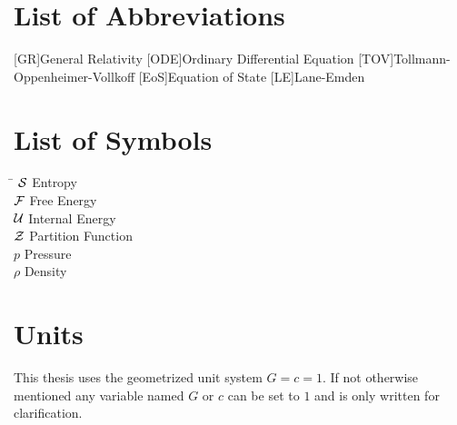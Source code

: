 \thispagestyle{empty}
\section*{List of Abbreviations}
\begin{acronym}[TOV]
	[GR]{General Relativity}
	[ODE]{Ordinary Differential Equation}
	[TOV]{Tollmann-Oppenheimer-Vollkoff}
	[EoS]{Equation of State}
	[LE]{Lane-Emden}
\end{acronym}

\listoffigures
{}
\listoftables

\section*{List of Symbols}
\begin{tabbing}
	\hspace{2cm}\=\kill
	$\mathcal{S}$				\> Entropy\\
	$\mathcal{F}$				\> Free Energy\\
	$\mathcal{U}$				\> Internal Energy\\
	$\mathcal{Z}$				\> Partition Function\\
	$p$					\> Pressure\\
	$\rho$				\> Density
\end{tabbing}

\section*{Units}
This thesis uses the geometrized unit system $G=c=1$.
If not otherwise mentioned any variable named $G$ or $c$ can be set to $1$ and is only written for clarification.